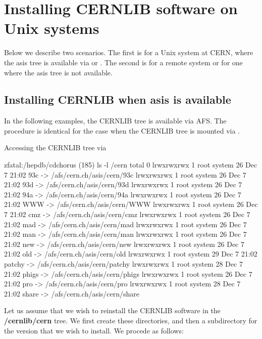 \chapter{Installing CERNLIB software on Unix systems}

\label{sect-UNIXINSTALL}

Below we describe two scenarios. The first is for a Unix system
at CERN, where the asis tree is available via \NFS{} or \AFS{}.
The second is for a remote system or for one where the asis tree
is not available.

\section{Installing CERNLIB when asis is available}

In the following examples, the CERNLIB tree is available via
AFS. The procedure is identical for the case when the CERNLIB
tree is mounted via \NFS{}.

\begin{XMPt}{Accessing the CERNLIB tree via \AFS{}}

\footnotesize{

zfatal:/hepdb/cdchorus (185) ls -l /cern
total 0
lrwxrwxrwx   1 root     system        26 Dec  7 21:02 93c -> /afs/cern.ch/asis/cern/93c
lrwxrwxrwx   1 root     system        26 Dec  7 21:02 93d -> /afs/cern.ch/asis/cern/93d
lrwxrwxrwx   1 root     system        26 Dec  7 21:02 94a -> /afs/cern.ch/asis/cern/94a
lrwxrwxrwx   1 root     system        26 Dec  7 21:02 WWW -> /afs/cern.ch/asis/cern/WWW
lrwxrwxrwx   1 root     system        26 Dec  7 21:02 cmz -> /afs/cern.ch/asis/cern/cmz
lrwxrwxrwx   1 root     system        26 Dec  7 21:02 mad -> /afs/cern.ch/asis/cern/mad
lrwxrwxrwx   1 root     system        26 Dec  7 21:02 man -> /afs/cern.ch/asis/cern/man
lrwxrwxrwx   1 root     system        26 Dec  7 21:02 new -> /afs/cern.ch/asis/cern/new
lrwxrwxrwx   1 root     system        26 Dec  7 21:02 old -> /afs/cern.ch/asis/cern/old
lrwxrwxrwx   1 root     system        29 Dec  7 21:02 patchy -> /afs/cern.ch/asis/cern/patchy
lrwxrwxrwx   1 root     system        28 Dec  7 21:02 phigs -> /afs/cern.ch/asis/cern/phigs
lrwxrwxrwx   1 root     system        26 Dec  7 21:02 pro -> /afs/cern.ch/asis/cern/pro
lrwxrwxrwx   1 root     system        28 Dec  7 21:02 share -> /afs/cern.ch/asis/cern/share

}

\end{XMPt}

Let us assume that we wish to reinstall the CERNLIB software in the {\bf /cernlib/cern}
tree. We first create these directories, and then a subdirectory for the version
that we wish to install. We procede as follows: 

